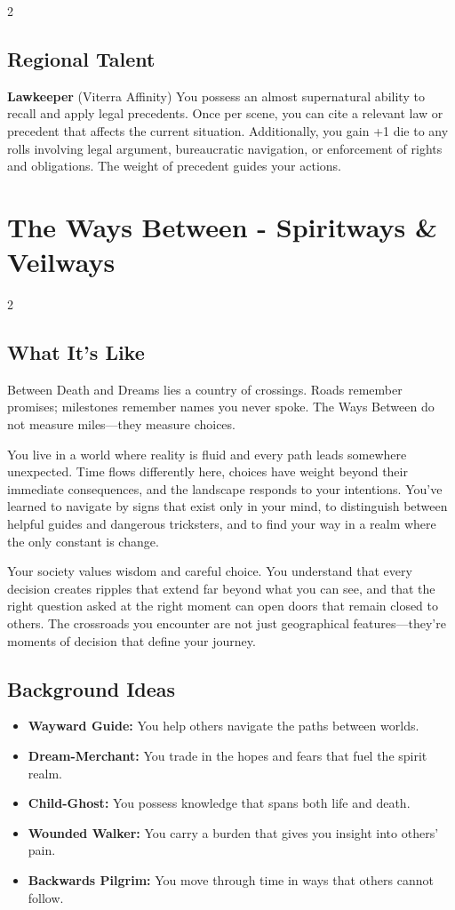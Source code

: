 \documentclass[11pt]{article}
\newcommand{\region}[1]{\section*{#1}}
\newcommand{\subregion}[1]{\subsection*{#1}}
\begin{document}
\begin{multicols}{2}
\subregion{Regional Talent}

\textbf{Lawkeeper} (Viterra Affinity)
You possess an almost supernatural ability to recall and apply legal precedents. Once per scene, you can cite a relevant law or precedent that affects the current situation. Additionally, you gain +1 die to any rolls involving legal argument, bureaucratic navigation, or enforcement of rights and obligations. The weight of precedent guides your actions.

\end{multicols}

\region{The Ways Between - Spiritways \& Veilways}

\begin{multicols}{2}
\subregion{What It's Like}

Between Death and Dreams lies a country of crossings. Roads remember promises; milestones remember names you never spoke. The Ways Between do not measure miles---they measure choices.

You live in a world where reality is fluid and every path leads somewhere unexpected. Time flows differently here, choices have weight beyond their immediate consequences, and the landscape responds to your intentions. You've learned to navigate by signs that exist only in your mind, to distinguish between helpful guides and dangerous tricksters, and to find your way in a realm where the only constant is change.

Your society values wisdom and careful choice. You understand that every decision creates ripples that extend far beyond what you can see, and that the right question asked at the right moment can open doors that remain closed to others. The crossroads you encounter are not just geographical features---they're moments of decision that define your journey.

\columnbreak

\subregion{Background Ideas}

\begin{itemize}[leftmargin=*]
    \item \textbf{Wayward Guide:} You help others navigate the paths between worlds.
    \item \textbf{Dream-Merchant:} You trade in the hopes and fears that fuel the spirit realm.
    \item \textbf{Child-Ghost:} You possess knowledge that spans both life and death.
    \item \textbf{Wounded Walker:} You carry a burden that gives you insight into others' pain.
    \item \textbf{Backwards Pilgrim:} You move through time in ways that others cannot follow.
\end{itemize}


\end{multicols}
\end{document}

